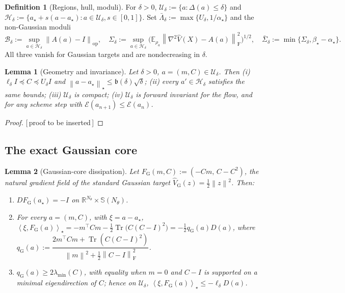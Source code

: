 \documentclass[11pt]{article}
\theoremstyle{plain}
\newtheorem{lemma}[lemma]{Lemma}
\theoremstyle{definition}
\newtheorem{definition}[definition]{Definition}
\theoremstyle{remark}
\newcommand{\R}{\mathbb{R}}
\newcommand{\E}{\mathbb{E}}
\newcommand{\Tr}{\operatorname{Tr}}
\newcommand{\Sym}{\mathbb{S}}
\newcommand{\Id}{I}
\newcommand{\op}{\mathrm{op}}
\newcommand{\Frob}{\mathrm{F}}
\newcommand{\calE}{\mathcal{E}}
\newcommand{\norm}[1]{\left\lVert #1\right\rVert}
\newcommand{\inner}[2]{\left\langle #1,#2\right\rangle}
\newcommand{\Ureg}{\mathcal{U}}
\newcommand{\Hreg}{\mathcal{H}}
\newcommand{\FGauss}{F_{\mathrm G}}
\newcommand{\PROOFHOLE}{{\color{red}\textsf{[\,proof to be inserted\,]}}}
\begin{document}
\begin{definition}[Regions, hull, moduli]
\label{def:region}
For $\delta>0$, $\Ureg_\delta:=\{a:\Delta(a)\leq\delta\}$ and
$\Hreg_\delta:=\{a_\star+s(a-a_\star):a\in\Ureg_\delta,s\in[0,1]\}$. Set
$\bar\Lambda_\delta:=\max\{U_\delta,1/\alpha_\star\}$ and the non-Gaussian moduli
\[
    \mathcal B_\delta:=\sup_{a\in\Hreg_\delta}\norm{A(a)-\Id}_{\op},
    \quad
    \Sigma_\delta:=\sup_{a\in\Hreg_\delta}\bigl(\E_{\rho_a}\norm{\nabla^2\widehat V(X)-A(a)}_{\Frob}^2\bigr)^{1/2},
    \quad
    \bar\Sigma_\delta:=\min\{\Sigma_\delta,\beta_\star-\alpha_\star\}.
\]
All three vanish for Gaussian targets and are nondecreasing in $\delta$.
\end{definition}

\begin{lemma}[Geometry and invariance]
\label{lem:region-geom}
Let $\delta>0$, $a=(m,C)\in\Ureg_\delta$. Then (i) $\ell_\delta\Id\preceq C\preceq U_\delta\Id$ and
$\norm{a-a_\star}_\star\leq\mathfrak b(\delta)\sqrt\delta$; (ii) every $a'\in\Hreg_\delta$ satisfies
the same bounds; (iii) $\Ureg_\delta$ is compact; (iv) $\Ureg_\delta$ is forward invariant for the
flow, and for any scheme step with $\calE(a_{n+1})\leq\calE(a_n)$.
\end{lemma}

\begin{proof}
\PROOFHOLE
\end{proof}

\subsection{The exact Gaussian core}

\begin{lemma}[Gaussian-core dissipation]
\label{lem:gauss-core}
Let $\FGauss(m,C):=(-Cm,\,C-C^2)$, the natural gradient field of the standard Gaussian target
$\widehat V_{\mathrm G}(z)=\tfrac12\norm z^2$. Then:
\begin{enumerate}
\item $D\FGauss(a_\star)=-\Id$ on $\R^{N_\theta}\times\Sym(N_\theta)$.
\item For every $a=(m,C)$, with $\xi=a-a_\star$,
$\inner{\xi}{\FGauss(a)}_\star=-m^\top Cm-\tfrac12\Tr\bigl(C(C-\Id)^2\bigr)=-\tfrac12q_{\mathrm G}(a)D(a)$,
where $q_{\mathrm G}(a):=\dfrac{2m^\top Cm+\Tr(C(C-\Id)^2)}{\norm m^2+\tfrac12\norm{C-\Id}_{\Frob}^2}$.
\item $q_{\mathrm G}(a)\geq2\lambda_{\min}(C)$, with equality when $m=0$ and $C-\Id$ is supported on
a minimal eigendirection of $C$; hence on $\Ureg_\delta$,
$\inner{\xi}{\FGauss(a)}_\star\leq-\ell_\delta D(a)$.
\end{enumerate}
\end{lemma}
\end{document}
